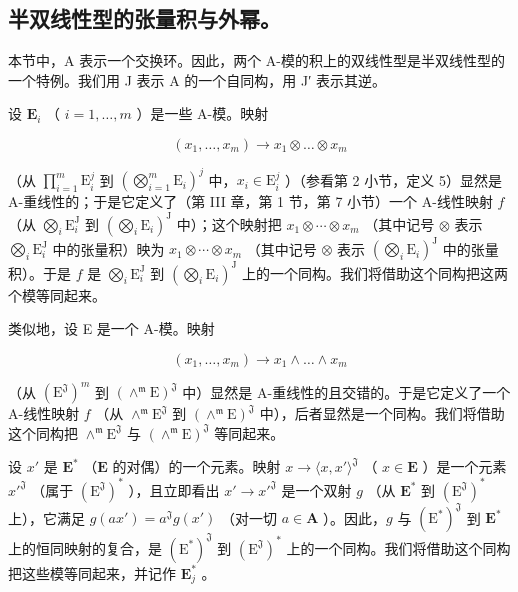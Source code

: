 \subsection{半双线性型的张量积与外幂。}

本节中，A 表示一个交换环。因此，两个 A-模的积上的双线性型是半双线性型的一个特例。我们用 J 表示 A 的一个自同构，用 J′ 表示其逆。

设 \(\mathbf{E}_i\) （ \(i = 1, \ldots, m\) ）是一些 A-模。映射

\[
(x _ {1}, \dots , x _ {m}) \rightarrow x _ {1} \otimes \dots \otimes x _ {m}
\]

（从 \(\prod_{i=1}^{m}\mathrm{E}_{i}^{j}\) 到 \((\bigotimes_{i=1}^{m}\mathrm{E}_{i})^{j}\) 中，\(x_{i}\in\mathrm{E}_{i}^{j}\) ）（参看第 2 小节，定义 5）显然是 A-重线性的；于是它定义了（第 III 章，第 1 节，第 7 小节）一个 A-线性映射 \(f\) （从 \(\bigotimes_{i}\mathrm{E}_{i}^{\mathrm{J}}\) 到 \((\bigotimes_{i}\mathrm{E}_{i})^{\mathrm{J}}\) 中）；这个映射把 \(x_{1}\otimes\cdots\otimes x_{m}\) （其中记号 \(\otimes\) 表示 \(\bigotimes_{i}\mathrm{E}_{i}^{\mathrm{J}}\) 中的张量积）映为 \(x_{1}\otimes\cdots\otimes x_{m}\) （其中记号 \(\otimes\) 表示 \((\bigotimes_{i}\mathrm{E}_{i})^{\mathrm{J}}\) 中的张量积）。于是 \(f\) 是 \(\bigotimes_{i}\mathrm{E}_{i}^{\mathrm{J}}\) 到 \((\bigotimes_{i}\mathrm{E}_{i})^{\mathrm{J}}\) 上的一个同构。我们将借助这个同构把这两个模等同起来。

类似地，设 E 是一个 A-模。映射

\[
(x _ {1}, \dots , x _ {m}) \rightarrow x _ {1} \wedge \dots \wedge x _ {m}
\]

（从 \((\mathrm{E}^{\mathfrak{J}})^{m}\) 到 \((\wedge^{\mathfrak{m}}\mathrm{E})^{\mathfrak{J}}\) 中）显然是 A-重线性的且交错的。于是它定义了一个 A-线性映射 \(f\) （从 \(\wedge^{\mathfrak{m}}\mathrm{E}^{\mathfrak{J}}\) 到 \((\wedge^{\mathfrak{m}}\mathrm{E})^{\mathfrak{J}}\) 中），后者显然是一个同构。我们将借助这个同构把 \(\wedge^{\mathfrak{m}}\mathrm{E}^{\mathfrak{J}}\) 与 \((\wedge^{\mathfrak{m}}\mathrm{E})^{\mathfrak{J}}\) 等同起来。

设 \(x'\) 是 \(\mathbf{E}^*\) （\(\mathbf{E}\) 的对偶）的一个元素。映射 \(x \to \langle x, x' \rangle^{\mathfrak{J}}\) （ \(x \in \mathbf{E}\) ）是一个元素 \(x'^{\mathfrak{J}}\) （属于 \((\mathrm{E}^{\mathfrak{J}})^*\) ），且立即看出 \(x' \to x'^{\mathfrak{J}}\) 是一个双射 \(g\) （从 \(\mathbf{E}^*\) 到 \((\mathrm{E}^{\mathfrak{J}})^*\) 上），它满足 \(g(ax') = a^{\mathfrak{J}}g(x')\) （对一切 \(a \in \mathbf{A}\) ）。因此，\(g\) 与 \((\mathrm{E}^*)^{\mathfrak{J}}\) 到 \(\mathbf{E}^*\) 上的恒同映射的复合，是 \((\mathrm{E}^*)^{\mathfrak{J}}\) 到 \((\mathrm{E}^{\mathfrak{J}})^*\) 上的一个同构。我们将借助这个同构把这些模等同起来，并记作 \(\mathbf{E}_j^*\) 。

